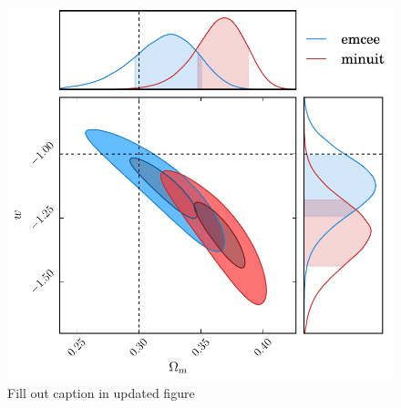 \documentclass[a4paper,fleqn,usenatbib]{mnras}
\newcommand{\red}{\color{red}}
\begin{document}
\begin{figure}
	\includegraphics[width=\columnwidth]{../output/comparison_deep.pdf}
	\caption{{\red Fill out caption in updated figure}}
	\label{fig:comparison_deep}
\end{figure}

%
\end{document}
